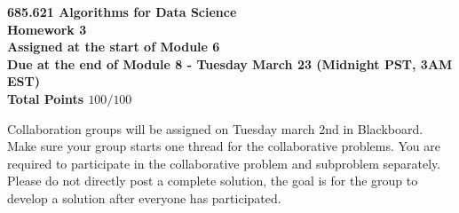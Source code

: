 \documentclass{article}
\begin{document}
\begin{center}
\bfseries 685.621 Algorithms for Data Science \\
Homework 3 \\
Assigned at the start of Module 6 \\
Due at the end of Module 8 - Tuesday March 23 (Midnight PST, 3AM EST)\\
Total Points $100/100$
\end{center}


Collaboration groups will be assigned on Tuesday march 2nd in Blackboard. Make sure your group starts one thread for the collaborative problems. You are required to participate in the collaborative problem and subproblem separately. Please do not directly post a complete solution, the goal is for the group to develop a solution after everyone has participated.\\
\end{document}
